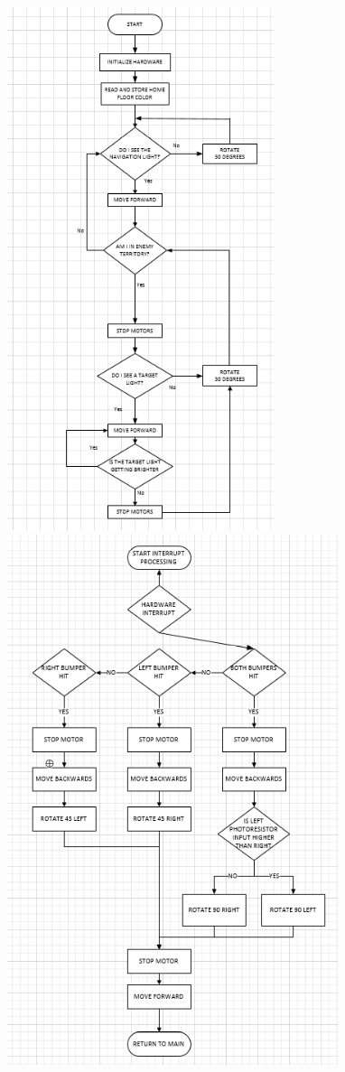 \documentclass{article}
\begin{document}
    \begin{center}
    \includegraphics{MainFlowchart.png}
    \newpage
    \includegraphics{BumperFlowchart.png}
    \end{center}
    
\end{document}
